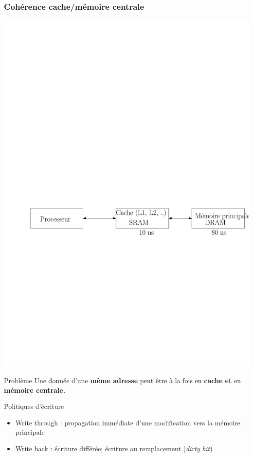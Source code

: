 \documentclass{beamer}
\begin{document}
\begin{frame}
\frametitle{Cohérence cache/mémoire centrale}

\centering\includegraphics[width=\linewidth]{Figs/cache_mem}

\begin{block}{Problème}
Une donnée d'une \textbf{même adresse} peut être à la fois en \textbf{cache et} en \textbf{mémoire centrale.}
\end{block}

\begin{block}{Politiques d'écriture}
\begin{itemize}
\item Write through : propagation immédiate d'une modification vers la mémoire principale
\item Write back : écriture différée; écriture au remplacement (\emph{dirty bit})
\end{itemize}
\end{block}

\end{frame}
\end{document}

